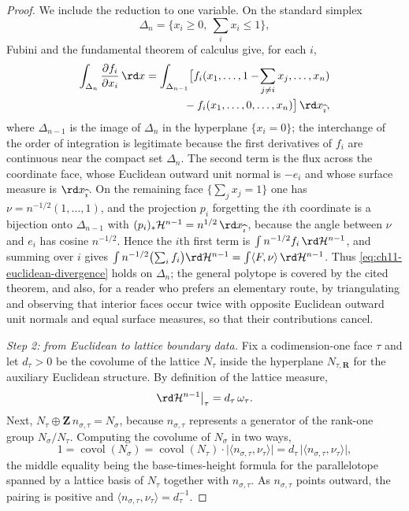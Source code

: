 \begin{proof}
We include the reduction to one variable.  On the standard simplex
\[
 \Delta_n=\{x_i\geq0,\ \textstyle\sum_i x_i\leq1\},
\]
Fubini and the fundamental theorem of calculus give, for each $i$,
\[
\begin{split}
 \int_{\Delta_n}\frac{\partial f_i}{\partial x_i}\,\rd x
 =\int_{\Delta_{n-1}}
 \bigl[
 f_i(x_1,\ldots,1-\!\sum_{j\ne i}x_j,\ldots,x_n)\\
 {}-f_i(x_1,\ldots,0,\ldots,x_n)
 \bigr]\,\rd x_{\widehat{\imath}} ,
\end{split}
\]
where $\Delta_{n-1}$ is the image of $\Delta_n$ in the hyperplane
$\{x_i=0\}$; the interchange of the order of integration is legitimate
because the first derivatives of $f_i$ are continuous near the compact
set $\Delta_n$.  The second term is
the flux across the coordinate face, whose Euclidean outward unit normal is
$-e_i$ and whose surface measure is $\rd x_{\widehat\imath}$.  On the
remaining face $\{\sum_jx_j=1\}$ one has
$\nu=n^{-1/2}(1,\ldots,1)$, and the projection $p_i$ forgetting the $i$th
coordinate is a bijection onto $\Delta_{n-1}$ with
$(p_i)_*\mathcal H^{n-1}=n^{1/2}\,\rd x_{\widehat\imath}$, because the angle
between $\nu$ and $e_i$ has cosine $n^{-1/2}$.  Hence the $i$th first term is
$\int n^{-1/2}f_i\,\rd\mathcal H^{n-1}$, and summing over $i$ gives
$\int n^{-1/2}\bigl(\sum_if_i\bigr)\rd\mathcal H^{n-1}
=\int\langle F,\nu\rangle\,\rd\mathcal H^{n-1}$.  Thus
\eqref{eq:ch11-euclidean-divergence} holds on $\Delta_n$; the general
polytope is covered by the cited theorem, and also, for a reader who
prefers an elementary route, by triangulating and observing that interior
faces occur twice with opposite Euclidean outward unit normals and equal
surface measures, so that their contributions cancel.

\smallskip
\emph{Step 2: from Euclidean to lattice boundary data.}
Fix a codimension-one face $\tau$ and let $d_\tau>0$ be the covolume of the
lattice $N_\tau$ inside the hyperplane $N_{\tau,\mathbf R}$ for the auxiliary
Euclidean structure.  By definition of the lattice measure,
\[
 \rd\mathcal H^{n-1}\big|_\tau=d_\tau\,\omega_\tau .
\]
Next, $N_\tau\oplus\mathbf Z\,n_{\sigma,\tau}=N_\sigma$, because
$n_{\sigma,\tau}$ represents a generator of the rank-one group
$N_\sigma/N_\tau$.  Computing the covolume of $N_\sigma$ in two ways,
\[
 1=\operatorname{covol}(N_\sigma)
  =\operatorname{covol}(N_\tau)\cdot
   \bigl|\langle n_{\sigma,\tau},\nu_\tau\rangle\bigr|
  =d_\tau\,\bigl|\langle n_{\sigma,\tau},\nu_\tau\rangle\bigr|,
\]
the middle equality being the base-times-height formula for the
parallelotope spanned by a lattice basis of $N_\tau$ together with
$n_{\sigma,\tau}$.  As $n_{\sigma,\tau}$ points outward, the pairing is
positive and $\langle n_{\sigma,\tau},\nu_\tau\rangle=d_\tau^{-1}$.


\end{proof}
